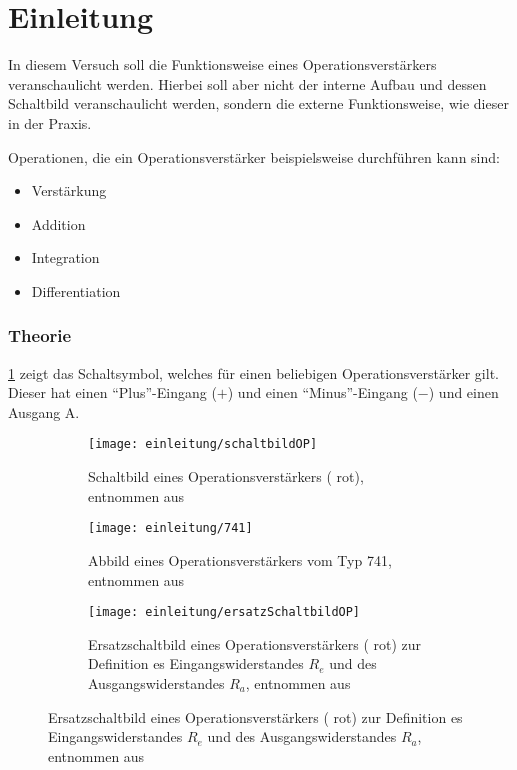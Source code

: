 \part{Einleitung}
In diesem Versuch soll die Funktionsweise eines Operationsverstärkers
veranschaulicht werden. Hierbei soll aber nicht der interne Aufbau und dessen 
Schaltbild veranschaulicht werden, sondern die externe Funktionsweise, wie 
dieser in der Praxis.

Operationen, die ein Operationsverstärker beispielsweise durchführen kann sind:
\begin{itemize}
	\item Verstärkung
	\item Addition
	\item Integration
	\item Differentiation
\end{itemize}


\section{Theorie}
\cref{fig:Einleitung/SchaltbildOperationsverstärker} zeigt das Schaltsymbol, 
welches für einen beliebigen Operationsverstärker gilt. Dieser hat einen 
"`Plus"'-Eingang ($+$) und einen "`Minus"'-Eingang ($-$) und einen Ausgang A.

\begin{figure}[H]
	\centering
	\begin{subfigure}[t]{0.3\linewidth}
		\centering
		\texttt{[image: einleitung/schaltbildOP]}
		\caption{Schaltbild eines Operationsverstärkers ({\color{red} rot}), 
		entnommen aus \cite{script}}
		\label{fig:Einleitung/SchaltbildOperationsverstärker}
	\end{subfigure}
	\quad
	\begin{subfigure}[t]{0.2\linewidth}
		\centering
		\texttt{[image: einleitung/741]}
		\caption{Abbild eines Operationsverstärkers vom Typ 741, entnommen aus 
		\cite{image741}}
		\label{fig:Einleitung/Operationsverstärker}
	\end{subfigure}
	\quad
	\begin{subfigure}[t]{0.3\linewidth}
		\centering
		\texttt{[image: einleitung/ersatzSchaltbildOP]}
		\caption{Ersatzschaltbild eines Operationsverstärkers ({\color{red} 
		rot}) zur Definition es Eingangswiderstandes $R_e$ und des 
		Ausgangswiderstandes $R_a$, entnommen aus \cite{script}}
		\label{fig:Einleitung/ErsatzschaltbildOperationsverstärker}
	\end{subfigure}
\end{figure}

